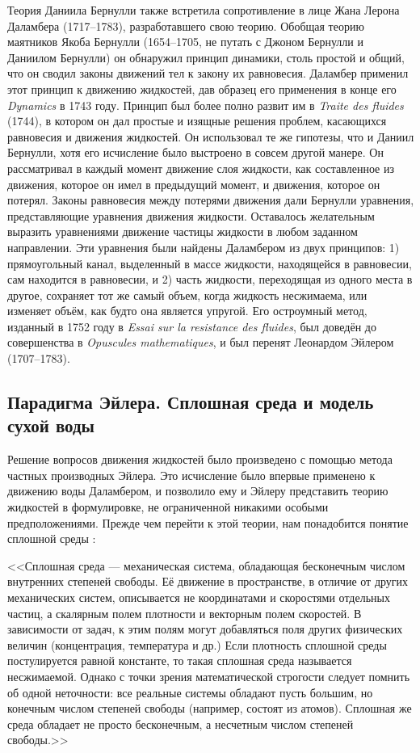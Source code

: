 Теория Даниила Бернулли также встретила сопротивление в лице Жана Лерона Даламбера (1717--1783), разработавшего 
свою теорию. Обобщая теорию маятников Якоба Бернулли (1654--1705, не путать с Джоном Бернулли и Даниилом Бернулли) 
он обнаружил принцип динамики, столь простой и общий, что он сводил законы движений тел к закону их равновесия. 
Даламбер применил этот принцип к движению жидкостей, дав образец его применения в конце его \textit{Dynamics} 
в 1743 году. Принцип был более полно развит им в \textit{Traite des fluides} (1744), в котором он дал простые 
и изящные решения проблем, касающихся равновесия и движения жидкостей. Он использовал те же гипотезы, что и 
Даниил Бернулли, хотя его исчисление было выстроено в совсем другой манере. Он рассматривал в каждый момент 
движение слоя жидкости, как составленное из движения, которое он имел в предыдущий момент, и движения, которое 
он потерял. Законы равновесия между потерями движения дали Бернулли уравнения, представляющие уравнения движения
жидкости. Оставалось желательным выразить уравнениями движение частицы жидкости в любом заданном направлении. 
Эти уравнения были найдены Даламбером из двух принципов: 1) прямоугольный канал, выделенный в массе жидкости, 
находящейся в равновесии, сам находится в равновесии, и 2) часть жидкости, переходящая из одного места в другое, 
сохраняет тот же самый объем, когда жидкость несжимаема, или изменяет объём, как будто она является упругой.
 Его остроумный метод, изданный в 1752 году в \textit{Essai sur la resistance des fluides}, был доведён до 
 совершенства в \textit{Opuscules mathematiques}, и был перенят Леонардом Эйлером (1707--1783).

\subsection{Парадигма Эйлера. Сплошная среда и модель сухой воды}

Решение вопросов движения жидкостей было произведено с помощью метода частных производных Эйлера. 
Это исчисление было впервые применено к движению воды Даламбером, и позволило ему и Эйлеру представить теорию
 жидкостей в формулировке, не ограниченной никакими особыми предположениями. Прежде чем перейти к этой теории, 
 нам понадобится понятие сплошной среды \cite{wiki}:

<<Сплошная среда — механическая система, обладающая бесконечным числом внутренних степеней свободы. Её движение 
в пространстве, в отличие от других механических систем, описывается не координатами и скоростями отдельных 
частиц, а скалярным полем плотности и векторным полем скоростей. В зависимости от задач, к этим полям могут 
добавляться поля других физических величин (концентрация, температура и др.) Если плотность сплошной среды 
постулируется равной константе, то такая сплошная среда называется несжимаемой. Однако с точки зрения 
математической строгости следует помнить об одной неточности: все реальные системы обладают пусть большим, 
но конечным числом степеней свободы (например, состоят из атомов). Сплошная же среда обладает не просто 
бесконечным, а несчетным числом степеней свободы.>>

